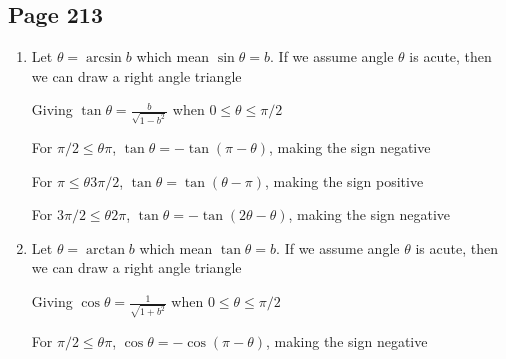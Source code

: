 \documentclass{article}
\newenvironment{solutions}[1]
{\subsection*{#1}
 \begin{enumerate}[leftmargin=1.5em]}
{\end{enumerate}}
\newcommand{\solution}{\item}
\begin{document}
\begin{solutions}{Page 213}
    Giving $\sin \theta = \sqrt{1-b^2}$ when $0 \leq \theta \leq \pi/2$

For $\pi/2 \leq \theta \pi$, $\sin \theta = \sin (\pi - \theta)$, making the sign positive

For $\pi \leq \theta 3\pi/2$, $\sin \theta = -\sin (\theta-\pi)$, making the sign negative

For $3\pi/2 \leq \theta 2\pi$, $\sin \theta = -\sin (2\theta-\theta)$, making the sign negative

\solution
Let $\theta = \arcsin b$ which mean $\sin \theta = b$. If we assume angle $\theta$ is acute, then we can draw a right angle triangle

    
    Giving $\tan \theta = \frac{b}{\sqrt{1-b^2}}$ when $0 \leq \theta \leq \pi/2$

For $\pi/2 \leq \theta \pi$, $\tan \theta = -\tan (\pi - \theta)$, making the sign negative

For $\pi \leq \theta 3\pi/2$, $\tan \theta = \tan (\theta-\pi)$, making the sign positive

For $3\pi/2 \leq \theta 2\pi$, $\tan \theta = -\tan (2\theta-\theta)$, making the sign negative

\solution
Let $\theta = \arctan b$ which mean $\tan \theta = b$. If we assume angle $\theta$ is acute, then we can draw a right angle triangle

    
    Giving $\cos \theta = \frac{1}{\sqrt{1+b^2}}$ when $0 \leq \theta \leq \pi/2$

For $\pi/2 \leq \theta \pi$, $\cos \theta = -\cos (\pi - \theta)$, making the sign negative


\end{solutions}
\end{document}
